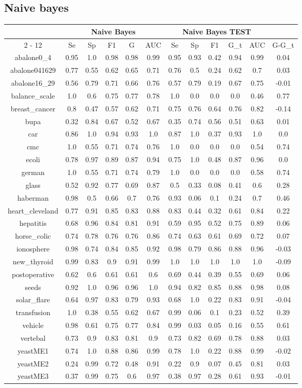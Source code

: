 \documentclass{article}%
\begin{document}
\subsection*{Naive bayes}%
\begin{tabular}{|c|c|c|c|c|c|c|c|c|c|c|c|}%
\hline%
&\multicolumn{5}{|c|}{Naive Bayes}&\multicolumn{5}{|c|}{Naive Bayes TEST}&\\%
\cline{2%
-%
12}%
&Se&Sp&F1&G&AUC&Se&Sp&F1&G\_t&AUC&G{-}G\_t\\%
\hline%
abalone0\_4&0.95&1.0&0.98&0.98&0.99&0.95&0.93&0.42&0.94&0.99&0.04\\%
abalone041629&0.77&0.55&0.62&0.65&0.71&0.76&0.5&0.24&0.62&0.7&0.03\\%
abalone16\_29&0.56&0.79&0.71&0.66&0.76&0.57&0.79&0.19&0.67&0.75&{-}0.01\\%
balance\_scale&1.0&0.6&0.75&0.77&0.78&1.0&0.0&0.0&0.0&0.46&0.77\\%
breast\_cancer&0.8&0.47&0.57&0.62&0.71&0.75&0.76&0.64&0.76&0.82&{-}0.14\\%
bupa&0.32&0.84&0.67&0.52&0.67&0.35&0.74&0.56&0.51&0.63&0.01\\%
car&0.86&1.0&0.94&0.93&1.0&0.87&1.0&0.37&0.93&1.0&0.0\\%
cmc&1.0&0.55&0.71&0.74&0.76&1.0&0.0&0.0&0.0&0.54&0.74\\%
ecoli&0.78&0.97&0.89&0.87&0.94&0.75&1.0&0.48&0.87&0.96&0.0\\%
german&1.0&0.55&0.71&0.74&0.79&1.0&0.0&0.0&0.0&0.58&0.74\\%
glass&0.52&0.92&0.77&0.69&0.87&0.5&0.33&0.08&0.41&0.6&0.28\\%
haberman&0.98&0.5&0.66&0.7&0.76&0.93&0.06&0.1&0.24&0.7&0.46\\%
heart\_cleveland&0.77&0.91&0.85&0.83&0.88&0.83&0.44&0.32&0.61&0.84&0.22\\%
hepatitis&0.68&0.96&0.84&0.81&0.91&0.59&0.95&0.52&0.75&0.89&0.06\\%
horse\_colic&0.74&0.78&0.76&0.76&0.86&0.74&0.63&0.61&0.69&0.72&0.07\\%
ionosphere&0.98&0.74&0.84&0.85&0.92&0.98&0.79&0.86&0.88&0.96&{-}0.03\\%
new\_thyroid&0.99&0.83&0.9&0.91&0.99&1.0&1.0&1.0&1.0&1.0&{-}0.09\\%
postoperative&0.62&0.6&0.61&0.61&0.6&0.69&0.44&0.39&0.55&0.69&0.06\\%
seeds&0.92&1.0&0.96&0.96&1.0&0.94&0.82&0.85&0.88&0.98&0.08\\%
solar\_flare&0.64&0.97&0.83&0.79&0.93&0.68&1.0&0.22&0.83&0.91&{-}0.04\\%
transfusion&1.0&0.38&0.55&0.62&0.67&0.99&0.06&0.1&0.23&0.52&0.39\\%
vehicle&0.98&0.61&0.75&0.77&0.84&0.99&0.03&0.05&0.16&0.55&0.61\\%
vertebal&0.73&0.9&0.83&0.81&0.9&0.73&0.82&0.69&0.78&0.88&0.03\\%
yeastME1&0.74&1.0&0.88&0.86&0.99&0.78&1.0&0.22&0.88&0.99&{-}0.02\\%
yeastME2&0.24&0.99&0.72&0.48&0.91&0.22&0.9&0.07&0.45&0.81&0.03\\%
yeastME3&0.37&0.99&0.75&0.6&0.97&0.38&0.97&0.28&0.61&0.93&{-}0.01\\%
\hline%
\end{tabular}
\end{document}
